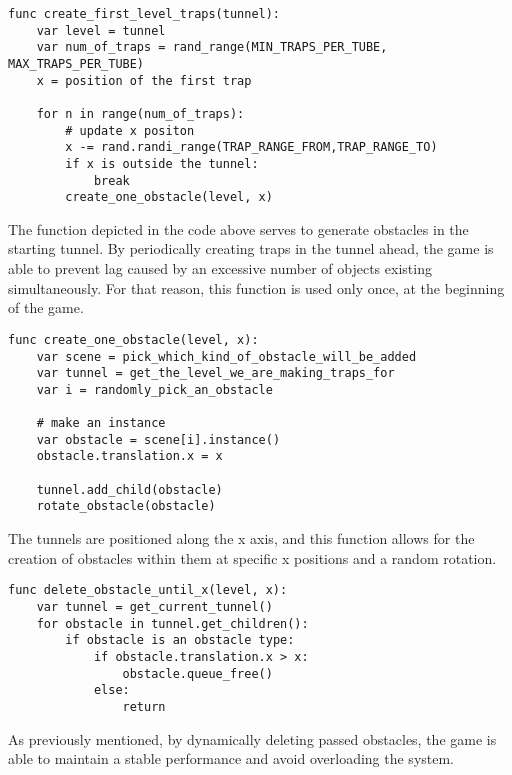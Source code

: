 \begin{center}
\hrulefill
\begin{lstlisting}
func create_first_level_traps(tunnel):
    var level = tunnel
    var num_of_traps = rand_range(MIN_TRAPS_PER_TUBE, MAX_TRAPS_PER_TUBE)
    x = position of the first trap
	
    for n in range(num_of_traps):
        # update x positon
        x -= rand.randi_range(TRAP_RANGE_FROM,TRAP_RANGE_TO)
        if x is outside the tunnel:
            break
        create_one_obstacle(level, x)
\end{lstlisting}
\hrulefill
\end{center}

The function depicted in the code above serves to generate obstacles in the starting tunnel. By periodically creating traps in the tunnel ahead, the game is able to prevent lag caused by an excessive number of objects existing simultaneously. For that reason, this function is used only once, at the beginning of the game.

\begin{center}
\hrulefill
\begin{lstlisting}
func create_one_obstacle(level, x):
    var scene = pick_which_kind_of_obstacle_will_be_added
    var tunnel = get_the_level_we_are_making_traps_for
    var i = randomly_pick_an_obstacle
	
    # make an instance
    var obstacle = scene[i].instance()
    obstacle.translation.x = x
	
    tunnel.add_child(obstacle)
    rotate_obstacle(obstacle)
\end{lstlisting}
\hrulefill
\end{center}

The tunnels are positioned along the x axis, and this function allows for the creation of obstacles within them at specific x positions and a random rotation.

\begin{center}
\hrulefill
\begin{lstlisting}
func delete_obstacle_until_x(level, x):
    var tunnel = get_current_tunnel()
    for obstacle in tunnel.get_children():
        if obstacle is an obstacle type:
            if obstacle.translation.x > x:
                obstacle.queue_free()
            else:
                return
\end{lstlisting}
\hrulefill
\end{center}

As previously mentioned, by dynamically deleting passed obstacles, the game is able to maintain a stable performance and avoid overloading the system.